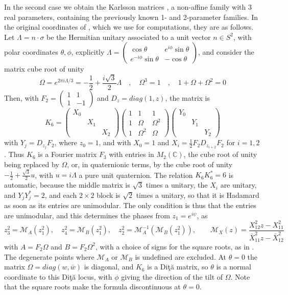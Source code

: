 \documentclass[11pt]{amsart}
\begin{document}
\noindent In the second case we obtain the Karlsson matrices \cite{kar}, a non-affine family with 3 real parameters, containing the previously known 1- and 2-parameter families. In the original coordinates of \cite{kar}, which we use for computations, they are as follows. Let $\Lambda=n\cdot\sigma$ be the Hermitian unitary associated to a unit vector $n\in S^2$, with polar coordinates $\theta,\phi$, explicitly $\Lambda=\begin{pmatrix}\cos\theta&e^{i\phi}\sin\theta\\e^{-i\phi}\sin\theta&-\cos\theta\end{pmatrix}$, and consider the matrix cube root of unity
$$\Omega=e^{2\pi i\Lambda/3}=-\frac{1}{2}+\frac{i\sqrt3}{2}\Lambda\quad,\quad\Omega^3=1\quad,\quad1+\Omega+\Omega^2=0$$
Then, with $F_2=\begin{pmatrix}1&1\\1&-1\end{pmatrix}$ and $D_z=diag(1,z)$, the matrix is
$$K_6=\begin{pmatrix}X_0\\&X_1\\&&X_2\end{pmatrix}\begin{pmatrix}1&1&1\\1&\Omega&\Omega^2\\1&\Omega^2&\Omega\end{pmatrix}\begin{pmatrix}Y_0\\&Y_1\\&&Y_2\end{pmatrix}$$
with $Y_j=D_{z_j}F_2$, where $z_0=1$, and with $X_0=1$ and $X_i=\frac{1}{2}F_2D_{z_{i+2}}F_2$ for $i=1,2$. Thus $K_6$ is a Fourier matrix $F_3$ with entries in $M_2(\mathbb C)$, the cube root of unity being replaced by $\Omega$, or, in quaternionic terms, by the cube root of unity $-\frac{1}{2}+\frac{\sqrt3}{2}u$, with $u=i\Lambda$ a pure unit quaternion. The relation $K_6K_6^*=6$ is automatic, because the middle matrix is $\sqrt3$ times a unitary, the $X_i$ are unitary, and $Y_jY_j^*=2$, and each $2\times2$ block is $\sqrt2$ times a unitary, so that it is Hadamard as soon as its entries are unimodular. The only condition is thus that the entries are unimodular, and this determines the phases from $z_1=e^{i\psi}$, as
$$z_3^2=\mathcal M_A(z_1^2),\quad z_4^2=\mathcal M_B(z_1^2),\quad z_2^2=\mathcal M_A^{-1}(\mathcal M_B(z_1^2)),\qquad \mathcal M_X(z)=\frac{X_{12}^2z-X_{11}^2}{\bar{X}_{11}^2z-\bar{X}_{12}^2}$$
with $A=F_2\Omega$ and $B=F_2\Omega^2$, with a choice of signs for the square roots, as in \cite{kar}. The degenerate points where $\mathcal M_A$ or $\mathcal M_B$ is undefined are excluded. At $\theta=0$ the matrix $\Omega=diag(w,\bar{w})$ is diagonal, and $K_6$ is a Di\c t\u a matrix, so $\theta$ is a normal coordinate to this Di\c t\u a locus, with $\phi$ giving the direction of the tilt of $\Omega$. Note that the square roots make the formula discontinuous at $\theta=0$.
\end{document}
